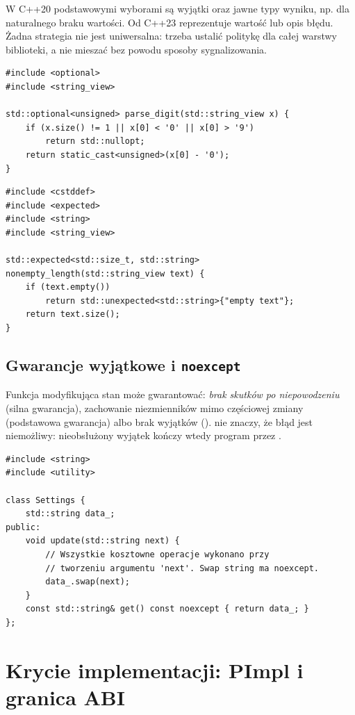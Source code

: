 W C++20 podstawowymi wyborami są wyjątki oraz jawne typy wyniku,
np.  dla naturalnego braku wartości. Od C++23
 reprezentuje wartość lub opis błędu. Żadna
strategia nie jest uniwersalna: trzeba ustalić politykę dla całej
warstwy biblioteki, a nie mieszać bez powodu sposoby sygnalizowania.

\begin{lstlisting}[caption={Jawny blad jako typ wyniku w C++20.}]
#include <optional>
#include <string_view>

std::optional<unsigned> parse_digit(std::string_view x) {
    if (x.size() != 1 || x[0] < '0' || x[0] > '9')
        return std::nullopt;
    return static_cast<unsigned>(x[0] - '0');
}
\end{lstlisting}

\begin{lstlisting}[caption={Rozbudowany blad jako expected (C++23; fragment).}]
#include <cstddef>
#include <expected>
#include <string>
#include <string_view>

std::expected<std::size_t, std::string>
nonempty_length(std::string_view text) {
    if (text.empty())
        return std::unexpected<std::string>{"empty text"};
    return text.size();
}
\end{lstlisting}

\subsection{Gwarancje wyjątkowe i \texttt{noexcept}}

Funkcja modyfikująca stan może gwarantować: \emph{brak skutków po
niepowodzeniu} (silna gwarancja), zachowanie niezmienników mimo częściowej
zmiany (podstawowa gwarancja) albo brak wyjątków ().
 nie znaczy, że błąd jest niemożliwy: nieobsłużony
wyjątek kończy wtedy program przez .

\begin{lstlisting}[caption={Silna gwarancja przez przygotowanie kopii.}]
#include <string>
#include <utility>

class Settings {
    std::string data_;
public:
    void update(std::string next) {
        // Wszystkie kosztowne operacje wykonano przy
        // tworzeniu argumentu 'next'. Swap string ma noexcept.
        data_.swap(next);
    }
    const std::string& get() const noexcept { return data_; }
};
\end{lstlisting}

\section{Krycie implementacji: PImpl i granica ABI}
\label{sec:cpp20-pimpl}

